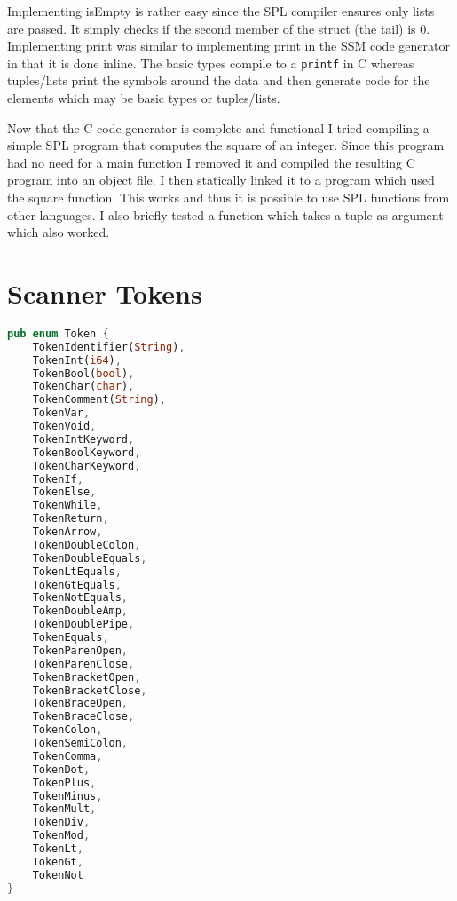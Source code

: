 \documentclass{article}
\begin{document}
Implementing isEmpty is rather easy since the SPL compiler ensures only lists are passed. It simply checks if the second member of the struct (the tail) is 0. Implementing print was similar to implementing print in the SSM code generator in that it is done inline. The basic types compile to a \texttt{printf} in C whereas tuples/lists print the symbols around the data and then generate code for the elements which may be basic types or tuples/lists.

Now that the C code generator is complete and functional I tried compiling a simple SPL program that computes the square of an integer. Since this program had no need for a main function I removed it and compiled the resulting C program into an object file. I then statically linked it to a program which used the square function. This works and thus it is possible to use SPL functions from other languages. I also briefly tested a function which takes a tuple as argument which also worked.

\clearpage
\appendix
\section{Scanner Tokens}
\label{Appendix1}
\begin{lstlisting}[language=Rust, style=boxed]
pub enum Token {
	TokenIdentifier(String),
	TokenInt(i64),
	TokenBool(bool),
	TokenChar(char),
	TokenComment(String),
	TokenVar,
	TokenVoid,
	TokenIntKeyword,
	TokenBoolKeyword,
	TokenCharKeyword,
	TokenIf,
	TokenElse,
	TokenWhile,
	TokenReturn,
	TokenArrow,
	TokenDoubleColon,
	TokenDoubleEquals,
	TokenLtEquals,
	TokenGtEquals,
	TokenNotEquals,
	TokenDoubleAmp,
	TokenDoublePipe,
	TokenEquals,
	TokenParenOpen,
	TokenParenClose,
	TokenBracketOpen,
	TokenBracketClose,
	TokenBraceOpen,
	TokenBraceClose,
	TokenColon,
	TokenSemiColon,
	TokenComma,
	TokenDot,
	TokenPlus,
	TokenMinus,
	TokenMult,
	TokenDiv,
	TokenMod,
	TokenLt,
	TokenGt,
	TokenNot
}
\end{lstlisting}
\end{document}
